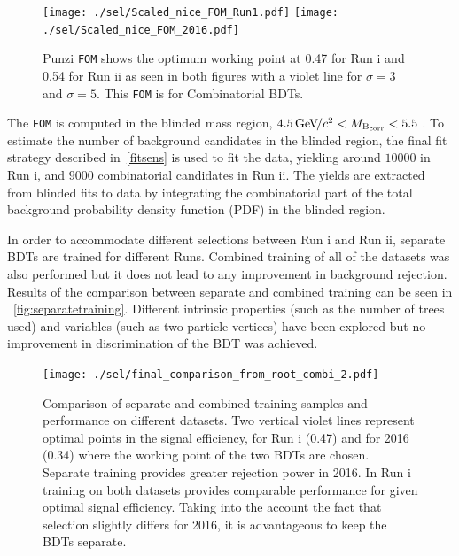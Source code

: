 \begin{figure}[ht]
\centering
	\texttt{[image: ./sel/Scaled\_nice\_FOM\_Run1.pdf]}%
	\texttt{[image: ./sel/Scaled\_nice\_FOM\_2016.pdf]}%
	\caption{ Punzi \texttt{FOM} shows the optimum working point at 0.47 for Run \Rn{1} and 0.54 for Run \Rn{2} as seen in both figures with a violet line for $\sigma=3$ and $\sigma=5$. This \texttt{FOM} is for Combinatorial BDTs.}
\label{fig:punzifom}
\end{figure}


The \texttt{FOM} is computed in the blinded mass region, $4.5{\mathrm{\,Ge\kern -0.1em V\!/}c^2} <M_{\mathrm{B_{corr}}} <5.5$ \gevcc. To estimate the number of background candidates in the blinded region, the final fit strategy described in~\autoref{fitsens} is used to fit the data, yielding around $10000$ in Run \Rn{1}, and $9000$ combinatorial candidates in Run \Rn{2}. The yields are extracted from blinded fits to data by integrating the combinatorial part of the total background probability density function (PDF) in the blinded region.

In order to accommodate different selections between Run \Rn{1} and Run \Rn{2}, separate BDTs are trained for different Runs. Combined training of all of the datasets was also performed but it does not lead to any improvement in background rejection. Results of the comparison between separate and combined training can be seen in ~\autoref{fig:separatetraining}. Different intrinsic properties (such as the number of trees used) and variables (such as two-particle vertices) have been explored but no improvement in discrimination of the BDT was achieved.


\begin{figure}[ht]
\centering
\texttt{[image: ./sel/final\_comparison\_from\_root\_combi\_2.pdf]}
	\caption{Comparison of separate and combined training samples and performance on different datasets. Two vertical violet lines represent optimal points in the signal efficiency, for Run \Rn{1} (0.47) and for 2016 (0.34) where the working point of the two BDTs are chosen. Separate training provides greater rejection power in 2016. In Run \Rn{1} training on both datasets provides comparable performance for given optimal signal efficiency. Taking into the account the fact that selection slightly differs for 2016, it is advantageous to keep the BDTs separate.}
\label{fig:separatetraining}
\end{figure}




